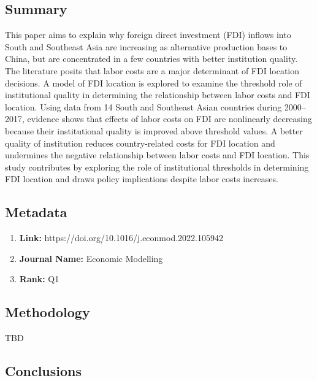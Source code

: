 \documentclass[10pt, oneside]{article}
\begin{document}
\subsection{Summary}
This paper aims to explain why foreign direct investment (FDI) inflows into South and Southeast Asia are increasing as alternative production bases to China, but are
concentrated in a few countries with better institution quality. The literature posits that labor costs are a major determinant of FDI location decisions. A model
of FDI location is explored to examine the threshold role of institutional quality in determining the relationship between labor costs and FDI location. Using data
from 14 South and Southeast Asian countries during 2000–2017, evidence shows that effects of labor costs on FDI are nonlinearly decreasing because their institutional
quality is improved above threshold values. A better quality of institution reduces country-related costs for FDI location and undermines the negative relationship
between labor costs and FDI location. This study contributes by exploring the role of institutional thresholds in determining FDI location and draws policy
implications despite labor costs increases. \cite{ZHANG2022105942}
\subsection{Metadata}
\begin{enumerate}
	\item \textbf{Link:} https://doi.org/10.1016/j.econmod.2022.105942
	\item \textbf{Journal Name:} Economic Modelling
	\item \textbf{Rank:} Q1
\end{enumerate}

\subsection{Methodology}

TBD

\subsection{Conclusions}
\end{document}
